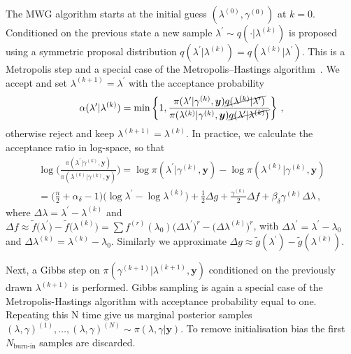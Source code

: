 The MWG algorithm starts at the initial guess $( \lambda^{(0)} , \gamma^{(0)}  )$ at $k=0$.
Conditioned on the previous state a new sample $\lambda^{\prime} \sim q(\cdot |  \lambda^{(k)})$ is proposed using a symmetric proposal distribution $q(\lambda^{\prime} |  \lambda^{(k)}) = q(\lambda^{(k)} |  \lambda^{\prime})$.
This is a Metropolis step and a special case of the Metropolis--Hastings algorithm~\cite{roberts2006harris}.
We accept and set $\lambda^{(k+1)} = \lambda^{\prime}$ with the acceptance probability
\begin{align}
\alpha( \lambda^{\prime} | \lambda^{(k)}) = \min \left\{ 1, \frac{\pi(\lambda^{\prime}  | \gamma^{(k)}, \bm{y}) \cancel{q(\lambda^{(k)} | \lambda^{\prime} ) } }{\pi(\lambda^{(k)} | \gamma^{(k)}, \bm{y}) \cancel{q(\lambda^{\prime} | \lambda^{(k)})} } \right\} \, ,
\end{align}
otherwise reject and keep $\lambda^{(k+1)} = \lambda^{(k)}$.
In practice, we calculate the acceptance ratio in log-space, so that
\begin{align} 
	\log\Bigg(  \frac{\pi(\lambda^{\prime} | \gamma^{(k)}, \bm{y})  }{\pi(\lambda^{(k)}| \gamma^{(k)}, \bm{y})}  \Bigg)
	= \log  \pi(\lambda^{\prime} | \gamma^{(k)}, \bm{y} )   -\log   \pi(\lambda^{(k)}| \gamma^{(k)}, \bm{y}) \\
	= \Bigg( \frac{n}{2}+\alpha_{\delta}-1 \Bigg) \Big(\log\lambda^{\prime} - \log\lambda^{(k)} \Big) + \frac{1}{2} \Delta g + \frac{\gamma^{(k)}}{2} \Delta f  + \beta_\delta \gamma^{(k)} \Delta \lambda  \, ,
\end{align}
where $\Delta \lambda = \lambda^{\prime} - \lambda^{(k)} $ and  $\Delta f \approx  \tilde{f} \big(\lambda^\prime\big) - \tilde{f}\big(\lambda^{(k)}\big) =   \sum f^{(r)}(\lambda_0) \big(\Delta \lambda^\prime \big)^r- \big(\Delta \lambda^{(k)} \big)^r $, with  $\Delta \lambda^{\prime} = \lambda^\prime - \lambda_0 $ and $\Delta \lambda^{(k)} =  \lambda^{(k)} - \lambda_0$.
Similarly we approximate $\Delta g \approx \tilde{g}(\lambda^{\prime}) -\tilde{g}(\lambda^{(k)})$.

Next, a Gibbs step on $\pi(	\gamma^{(k+1)} |  \lambda^{(k+1)}, \bm{y}) $ conditioned on the previously drawn $ \lambda^{(k+1)}$ is performed.
Gibbs sampling is again a special case of the Metropolis-Hastings algorithm with acceptance probability equal to one.
Repeating this N time give us marginal posterior samples $(\lambda, \gamma)^{(1)}, \dots, (\lambda, \gamma)^{(N)} \sim  \pi(\lambda, \gamma| \bm{y})$.
To remove initialisation bias the first $N_{\text{burn-in}}$ samples are discarded.

